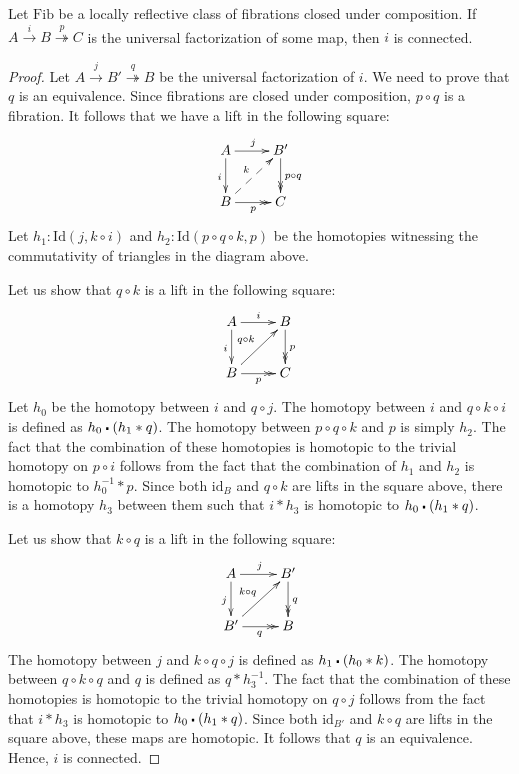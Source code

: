 \documentclass[reqno]{amsart}
\theoremstyle{definition}
\theoremstyle{remark}
\newcommand{\fs}[1]{\mathrm{#1}}
\newcommand{\Id}{\fs{Id}}
\newcommand{\sym}[1]{#1^{-1}}
\newcommand{\id}{\fs{id}}
\newcommand{\Fib}{\fs{Fib}}
\numberwithin{figure}{section}
\newcommand{\ct}{%
  \mathchoice{\mathbin{\raisebox{0.25ex}{$\displaystyle\centerdot$}}}%
             {\mathbin{\raisebox{0.25ex}{$\centerdot$}}}%
             {\mathbin{\raisebox{0.25ex}{$\scriptstyle\,\centerdot\,$}}}%
             {\mathbin{\raisebox{0.25ex}{$\scriptscriptstyle\,\centerdot\,$}}}
}
\begin{document}
\begin{lem}
Let $\Fib$ be a locally reflective class of fibrations closed under composition.
If $A \xrightarrow{i} B \overset{p}\twoheadrightarrow C$ is the universal factorization of some map, then $i$ is connected.
\end{lem}
\begin{proof}
Let $A \xrightarrow{j} B' \overset{q}\twoheadrightarrow B$ be the universal factorization of $i$.
We need to prove that $q$ is an equivalence.
Since fibrations are closed under composition, $p \circ q$ is a fibration.
It follows that we have a lift in the following square:
\[ \xymatrix{ A \ar[r]^j \ar[d]_i               & B' \ar@{->>}[d]^{p \circ q} \\
              B \ar@{->>}[r]_p \ar@{-->}[ur]^k  & C
            } \]
Let $h_1 : \Id(j, k \circ i)$ and $h_2 : \Id(p \circ q \circ k, p)$ be the homotopies witnessing the commutativity of triangles in the diagram above.

Let us show that $q \circ k$ is a lift in the following square:
\[ \xymatrix{ A \ar[r]^i \ar[d]_i                   & B \ar@{->>}[d]^p \\
              B \ar@{->>}[r]_p \ar[ur]^{q \circ k}  & C
            } \]
Let $h_0$ be the homotopy between $i$ and $q \circ j$.
The homotopy between $i$ and $q \circ k \circ i$ is defined as $h_0 \ct (h_1 * q)$.
The homotopy between $p \circ q \circ k$ and $p$ is simply $h_2$.
The fact that the combination of these homotopies is homotopic to the trivial homotopy on $p \circ i$ follows from the fact that the combination of $h_1$ and $h_2$ is homotopic to $\sym{h_0} * p$.
Since both $\id_B$ and $q \circ k$ are lifts in the square above, there is a homotopy $h_3$ between them such that $i * h_3$ is homotopic to $h_0 \ct (h_1 * q)$.

Let us show that $k \circ q$ is a lift in the following square:
\[ \xymatrix{ A \ar[r]^j \ar[d]_j                   & B' \ar@{->>}[d]^q \\
              B' \ar@{->>}[r]_q \ar[ur]^{k \circ q} & B
            } \]
The homotopy between $j$ and $k \circ q \circ j$ is defined as $h_1 \ct (h_0 * k)$.
The homotopy between $q \circ k \circ q$ and $q$ is defined as $q * \sym{h_3}$.
The fact that the combination of these homotopies is homotopic to the trivial homotopy on $q \circ j$ follows from the fact that $i * h_3$ is homotopic to $h_0 \ct (h_1 * q)$.
Since both $\id_{B'}$ and $k \circ q$ are lifts in the square above, these maps are homotopic.
It follows that $q$ is an equivalence.
Hence, $i$ is connected.
\end{proof}
\end{document}
